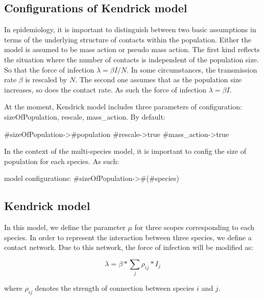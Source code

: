 \documentclass[a4paper,10pt,twoside]{book}
\begin{document}
\subsection{ Configurations of Kendrick model}
In epidemiology, it is important to distinguish between two basic assumptions in terms of the underlying structure of contacts within the population.
Either the model is assumed to be mass action or pseudo mass action.
The first kind reflects the situation where the number of contacts is independent of the population size.
So that the force of infection  $\lambda = \beta I / N$.
In some circumstances, the transmission rate  $\beta$ is rescaled by  $N$.
The second one assumes that as the population size increases, so does the contact rate.
As such the force of infection  $\lambda = \beta I$.

At the moment, Kendrick model includes three parameters of configuration: sizeOfPopulation, rescale, mass\_action.
By default:


\begin{code}{}
#sizeOfPopulation->#population
#rescale->true
#mass_action->true
\end{code}


In the context of the multi-species model, it is important to config the size of population for each species.
As such:


\begin{code}{}
model configurations: {#sizeOfPopulation->#(#species)}
\end{code}

\subsection{ Kendrick model}
In this model, we define the parameter  $\mu$ for three scopes corresponding to each species.
In order to represent the interaction between three species, we define a contact network.
Due to this network, the force of infection will be modified as:

  \begin{equation}
    \lambda = \beta * \sum_j \rho_{ij} * I_j
  \end{equation}
  
where  $\rho_{ij}$ denotes the strength of connection between species  $i$ and  $j$.

\end{document}
